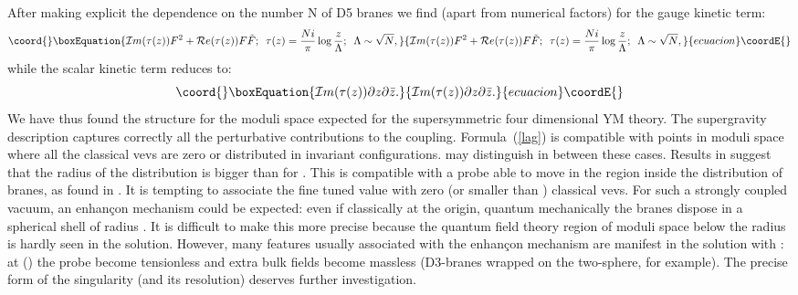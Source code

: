 \documentclass[a4paper,12pt]{article}
\begin{document}
After making explicit the dependence on the number N of D5 branes we find (apart from numerical factors) for the gauge kinetic term:
\begin{equation}\coord{}\boxEquation{
 {\cal I}m(\tau(z))F^2+{\cal R}e(\tau(z))F\tilde{F};\,\,\, \tau(z)={Ni\over \pi}\log {z\over\Lambda};\,\,\, \Lambda\sim{\sqrt N},
\label{lag}}{
 {\cal I}m(\tau(z))F^2+{\cal R}e(\tau(z))F\tilde{F};\,\,\, \tau(z)={Ni\over \pi}\log {z\over\Lambda};\,\,\, \Lambda\sim{\sqrt N},
}{ecuacion}\coordE{}\end{equation}
while the scalar kinetic term reduces to:
\begin{equation}\coord{}\boxEquation{
{\cal I}m(\tau(z))\partial z\partial \bar{z}.
}{
{\cal I}m(\tau(z))\partial z\partial \bar{z}.
}{ecuacion}\coordE{}\end{equation}
We have thus found the structure for the moduli space expected for the \coordHE{}
supersymmetric four dimensional YM theory. The supergravity description captures correctly all the perturbative contributions to the coupling. 
Formula~(\ref{lag}) is compatible with points in moduli space where
all the classical vevs are zero or distributed in \coordHE{} invariant
configurations. \coordHE{} may distinguish in between these cases.
Results in \cite{martelli} suggest that the radius of the
distribution is bigger than \myHighlight{$\Lambda$}\coordHE{} for \coordHE{}. This is compatible
with a probe able to move in the region inside the distribution
of branes, as found in \cite{martelli}.    
It is tempting to associate the fine tuned value \coordHE{} with zero
(or smaller than \myHighlight{$\Lambda$}\coordHE{}) classical vevs. 
For such a strongly coupled vacuum, an
enhan\c con mechanism \cite{jpp} could be expected: 
even if classically at the
origin, quantum mechanically the branes dispose in a spherical shell
of radius \myHighlight{$\Lambda$}\coordHE{}. It is difficult to make this more precise because
the quantum field theory region of moduli space 
below the radius \myHighlight{$\Lambda$}\coordHE{} is hardly seen in the solution.
However, many features usually associated with the enhan\c con mechanism
are manifest in the solution with \coordHE{}:  at \coordHE{} (\coordHE{})
the probe become tensionless and extra bulk fields
become massless (D3-branes wrapped on the two-sphere, for example).
 The precise form of the singularity (and its resolution)
deserves further investigation. 
\end{document}
